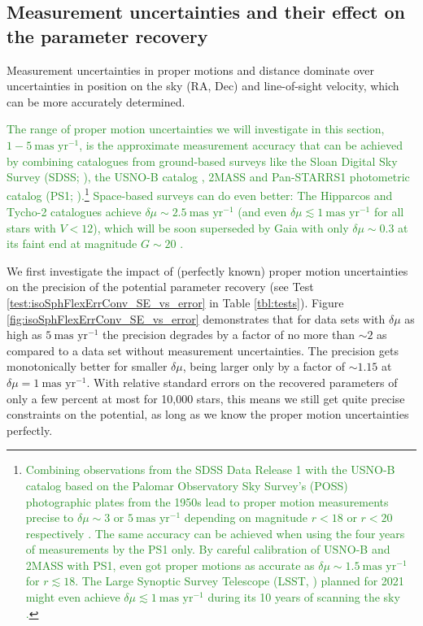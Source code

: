 \documentclass[iop,revtex4]{emulateapj}
\newcommand{\NEW}[1]{\textcolor{ForestGreen}{#1}}
\begin{document}
\subsection{Measurement uncertainties and their effect on the parameter recovery} \label{sec:results_errors}

Measurement uncertainties in proper motions and distance dominate over uncertainties in position on the sky (RA, Dec) and line-of-sight velocity, which can be more accurately determined.

\NEW{The range of proper motion uncertainties we will investigate in this section, $1-5~\text{mas yr}^{-1}$, is the approximate measurement accuracy that can be achieved by combining catalogues from ground-based surveys like the  Sloan Digital Sky Survey (SDSS; \citealt{2003AJ....126.2081A}), the USNO-B catalog \citep{2003AJ....125..984M}, 2MASS \citep{2006AJ....131.1163S} and Pan-STARRS1 photometric catalog (PS1;  \citealt{2010SPIE.7733E..0EK}).}\footnote{\NEW{Combining observations from the SDSS Data Release 1 with the USNO-B catalog based on the Palomar Observatory Sky Survey's (POSS) photographic plates from the 1950s lead to proper motion measurements precise to $\delta\mu\sim3$ or $5~\text{mas yr}^{-1}$ depending on magnitude $r<18$ or $r<20$ respectively \citep{2004AJ....127.3034M,2008AJ....136..895M,2004ApJS..152..103G}. The same accuracy can be achieved when using the four years of measurements by the PS1 only. By careful calibration of USNO-B and 2MASS with PS1, \citet{2015ApJ...809...59S} even got proper motions as accurate as} \NEW{$\delta \mu\sim1.5~\text{mas yr}^{-1}$ for $r\lesssim 18$. The Large Synoptic Survey Telescope (LSST, \citealt{2008arXiv0805.2366I}) planned for 2021 might even achieve $\delta\mu \lesssim 1~\text{mas yr}^{-1}$ during its 10 years of scanning the sky \citep{2008IAUS..248..537I}.}} \NEW{Space-based surveys can do even better: The Hipparcos \citep{1997ESASP1200.....E} and Tycho-2 \citep{2000A&A...355L..27H} catalogues achieve $\delta \mu\sim2.5~\text{mas yr}^{-1}$ (and even $\delta\mu \lesssim 1 ~\text{mas yr}^{-1}$ for all stars with $V <12$), which will be soon superseded by Gaia with only $\delta \mu\sim0.3$ at its faint end at magnitude $G\sim20$ \citep{2014EAS....67...23D}.}

We first investigate the impact of (perfectly known) proper motion uncertainties on the precision of the potential parameter recovery (see Test \ref{test:isoSphFlexErrConv_SE_vs_error} in Table \ref{tbl:tests}). Figure \ref{fig:isoSphFlexErrConv_SE_vs_error} demonstrates that for data sets with $\delta \mu$ as high as $5~\text{mas yr}^{-1}$ the precision degrades by  a factor of no more than $\sim2$ as compared to a data set without measurement uncertainties. The precision gets monotonically better for smaller $\delta \mu$, being larger only by a factor of $\sim 1.15$ at $\delta \mu=1~\text{mas yr}^{-1}$. With relative standard errors on the recovered parameters of only a few percent at most for 10,000 stars, this means we still get quite precise constraints on the potential, as long as we know the proper motion uncertainties perfectly.
\end{document}
